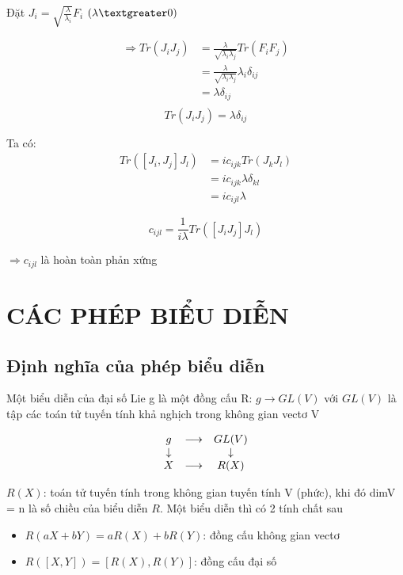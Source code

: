 \documentclass{report}
\begin{document}
Đặt \(J_{i} = \sqrt{\frac{\lambda}{\lambda_{i}}} F_{i} \) \((\lambda \textgreater 0) \)	

	\begin{align*}
		\Rightarrow Tr(J_{i}J_{j}) & = \frac{\lambda}{\sqrt{\lambda_{i}\lambda_{j}}} Tr(F_{i}F_{j}) \\
		& =  \frac{\lambda}{\sqrt{\lambda_{i}\lambda_{j}}} \lambda_{i} \delta_{ij} \\
		& = \lambda \delta_{ij} \\
	\end{align*}
\[ Tr(J_{i}J_{j}) = \lambda \delta_{ij} \]

Ta có:
	\begin{align*}
		Tr([J_{i},J_{j}]J_{l}) & = ic_{ijk}Tr(J_{k}J_{l}) \\ 
		& = ic_{ijk} \lambda \delta_{kl} \\
		& = ic_{ijl} \lambda
	\end{align*}

\[ c_{ijl} = \frac{1}{i\lambda} Tr([J_{i}J_{j}]J_{l}) \]

\( \Rightarrow c_{ijl} \) là hoàn toàn phản xứng 

\chapter{CÁC PHÉP BIỂU DIỄN}

\section{Định nghĩa của phép biểu diễn}

Một biểu diễn của đại số Lie g là một đồng cấu R: \( g \longrightarrow GL(V) \) với \( GL(V) \) là tập các toán tử tuyến tính khả nghịch trong không gian vectơ V

	\[ \begin{matrix}
		 g & \longrightarrow & GL(V) \\
		 \downarrow & \hspace*{0cm} & \downarrow \\
		 X & \longrightarrow & R(X)
	\end{matrix} \]

\( R(X) \): toán tử tuyến tính trong không gian tuyến tính V (phức), khi đó dimV = n là số chiều của biểu diễn \( R \). Một biểu diễn thì có 2 tính chất sau

	\begin{itemize}
		\item \( R (aX + bY) = aR(X) + bR(Y) \): đồng cấu không gian vectơ
		\item \( R \left( \left[ X, Y \right] \right) = \left[ R(X), R(Y) \right] \): đồng cấu đại số
	\end{itemize}
\end{document}
